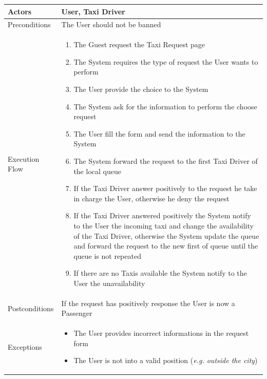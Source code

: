 \documentclass[english]{article}
\begin{document}
\begin{tabular}{lp{8cm}}
\hline
Actors & User, Taxi Driver \\
\hline
Preconditions & The User should not be banned \\
\hline
Execution Flow &  
		\begin{enumerate}
			\item The Guest request the Taxi Request page
			\item The System requires the type of request the User wants to perform
			\item The User provide the choice to the System
			\item The System ask for the information to perform the choose request
			\item The User fill the form and send the information to the System
			\item The System forward the request to the first Taxi Driver of the local queue
			\item If the Taxi Driver answer positively to the request he take in charge the User, otherwise he deny the request
			\item If the Taxi Driver answered positively the System notify to the User the incoming taxi and change the availability of the Taxi Driver, otherwise the System update the queue and forward the request to the new first of queue until the queue is not repeated
			\item If there are no Taxis available the System notify to the User the unavailability
		\end{enumerate} 
	\\ 
\hline
Postconditions & If the request has positively response the User is now a Passenger \\
\hline
Exceptions & 
	\begin{itemize} 
		\item The User provides incorrect informations in the request form
		\item The User is not into a valid position (\emph{e.g. outside the city})
	\end{itemize}
\end{tabular}
\end{document}
